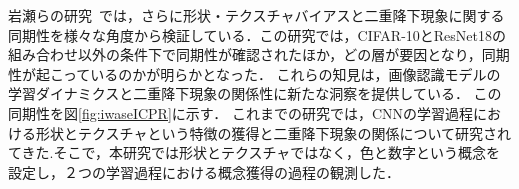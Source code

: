 岩瀬らの研究~\cite{icpr2024iwase}では，さらに形状・テクスチャバイアスと二重降下現象に関する同期性を様々な角度から検証している．この研究では，CIFAR-10とResNet18の組み合わせ以外の条件下で同期性が確認されたほか，どの層が要因となり，同期性が起こっているのかが明らかとなった．
これらの知見は，画像認識モデルの学習ダイナミクスと二重降下現象の関係性に新たな洞察を提供している．
この同期性を図\ref{fig:iwaseICPR}に示す．
これまでの研究では，CNNの学習過程における形状とテクスチャという特徴の獲得と二重降下現象の関係について研究されてきた.そこで，本研究では形状とテクスチャではなく，色と数字という概念を設定し，２つの学習過程における概念獲得の過程の観測した．
\newpage